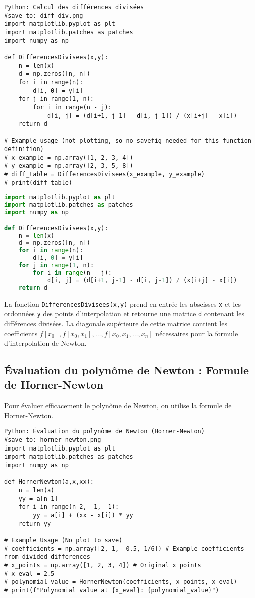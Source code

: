 \documentclass[oneside]{book}
\begin{document}
\begin{verbatim}
Python: Calcul des différences divisées
#save_to: diff_div.png
import matplotlib.pyplot as plt
import matplotlib.patches as patches
import numpy as np

def DifferencesDivisees(x,y):
    n = len(x)
    d = np.zeros([n, n])
    for i in range(n):
        d[i, 0] = y[i]
    for j in range(1, n):
        for i in range(n - j):
            d[i, j] = (d[i+1, j-1] - d[i, j-1]) / (x[i+j] - x[i])
    return d

# Example usage (not plotting, so no savefig needed for this function definition)
# x_example = np.array([1, 2, 3, 4])
# y_example = np.array([2, 3, 5, 8])
# diff_table = DifferencesDivisees(x_example, y_example)
# print(diff_table)

\end{verbatim}
\begin{lstlisting}[language=Python, caption=Calcul des différences divisées, label=code:diff_div_python]
import matplotlib.pyplot as plt
import matplotlib.patches as patches
import numpy as np

def DifferencesDivisees(x,y):
    n = len(x)
    d = np.zeros([n, n])
    for i in range(n):
        d[i, 0] = y[i]
    for j in range(1, n):
        for i in range(n - j):
            d[i, j] = (d[i+1, j-1] - d[i, j-1]) / (x[i+j] - x[i])
    return d
\end{lstlisting}
\begin{remark}
La fonction \texttt{DifferencesDivisees(x,y)} prend en entrée les abscisses \texttt{x} et les ordonnées \texttt{y} des points d'interpolation et retourne une matrice \texttt{d} contenant les différences divisées. La diagonale supérieure de cette matrice contient les coefficients $f[x_0], f[x_0, x_1], \dots, f[x_0, x_1, \dots, x_n]$ nécessaires pour la formule d'interpolation de Newton.
\end{remark}

\subsection{Évaluation du polynôme de Newton : Formule de Horner-Newton}

Pour évaluer efficacement le polynôme de Newton, on utilise la formule de Horner-Newton.

\begin{verbatim}
Python: Évaluation du polynôme de Newton (Horner-Newton)
#save_to: horner_newton.png
import matplotlib.pyplot as plt
import matplotlib.patches as patches
import numpy as np

def HornerNewton(a,x,xx):
    n = len(a)
    yy = a[n-1]
    for i in range(n-2, -1, -1):
        yy = a[i] + (xx - x[i]) * yy
    return yy

# Example Usage (No plot to save)
# coefficients = np.array([2, 1, -0.5, 1/6]) # Example coefficients from divided differences
# x_points = np.array([1, 2, 3, 4]) # Original x points
# x_eval = 2.5
# polynomial_value = HornerNewton(coefficients, x_points, x_eval)
# print(f"Polynomial value at {x_eval}: {polynomial_value}")

\end{verbatim}
\end{document}
